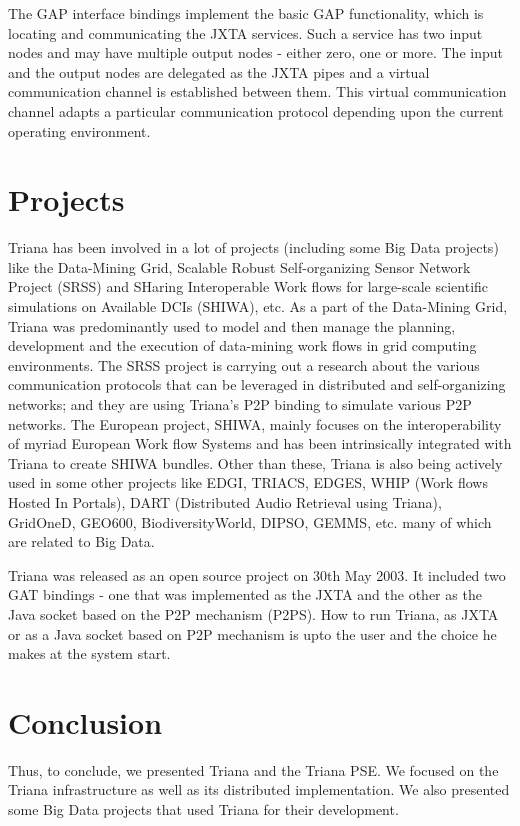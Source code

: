 \documentclass[9pt,twocolumn,twoside]{styles/osajnl}
\begin{document}
The GAP interface bindings implement the basic GAP functionality, which 
is locating and communicating the JXTA services. Such a service has two 
input nodes and may have multiple output nodes - either zero, one or 
more. The input and the output nodes are delegated as the JXTA pipes and 
a virtual communication channel is established between them. This 
virtual communication channel adapts a particular communication protocol 
depending upon the current operating environment. 

\section{Projects}

\cite{Triana-projects} Triana has been involved in a lot of projects
(including some Big Data projects) like the
\cite{Triana-Data-Mining-Grid} Data-Mining Grid, \cite{Triana-SRSS}
Scalable Robust Self-organizing Sensor Network Project (SRSS) and
\cite{Triana-SHIWA} SHaring Interoperable Work flows for large-scale
scientific simulations on Available DCIs (SHIWA), etc.  As a part of
the Data-Mining Grid, Triana was predominantly used to model and then
manage the planning, development and the execution of data-mining work
flows in grid computing environments.  \cite{Triana-SRSS} The SRSS
project is carrying out a research about the various communication
protocols that can be leveraged in distributed and self-organizing
networks; and they are using Triana's P2P binding to simulate various
P2P networks.  The European project, SHIWA, mainly focuses on the
interoperability of myriad European Work flow Systems and has been
intrinsically integrated with Triana to create \cite{Triana-SHIWA}
SHIWA bundles.  Other than these, Triana is also being actively used
in some other projects like EDGI, TRIACS, EDGES, WHIP (Work flows
Hosted In Portals), DART (Distributed Audio Retrieval using Triana),
GridOneD, GEO600, BiodiversityWorld, DIPSO, GEMMS, etc. many of which
are related to Big Data.

Triana was released as an open source project on 30th May 2003. It 
included two GAT bindings - one that was implemented as the JXTA and the 
other as the Java socket based on the P2P mechanism (P2PS). How to run 
Triana, as JXTA or as a Java socket based on P2P mechanism is upto the 
user and the choice he makes at the system start.

\section{Conclusion}

Thus, to conclude, we presented Triana and the Triana PSE.  We focused
on the Triana infrastructure as well as its distributed
implementation.  We also presented some Big Data projects that used
Triana for their development.



\end{document}
